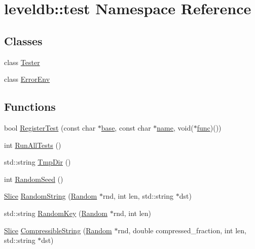 \hypertarget{namespaceleveldb_1_1test}{\section{leveldb\-:\-:test Namespace Reference}
\label{namespaceleveldb_1_1test}
}
\subsection*{Classes}
\begin{DoxyCompactItemize}
\item 
class \hyperlink{classleveldb_1_1test_1_1_tester}{Tester}
\item 
class \hyperlink{classleveldb_1_1test_1_1_error_env}{Error\-Env}
\end{DoxyCompactItemize}
\subsection*{Functions}
\begin{DoxyCompactItemize}
\item 
bool \hyperlink{namespaceleveldb_1_1test_aecde3e0440c4462e8d73aad728e3e819}{Register\-Test} (const char $\ast$\hyperlink{testharness_8cc_a70ff0f6c026c3dd1ef6aaf504e7fddc3}{base}, const char $\ast$\hyperlink{testharness_8cc_a8f8f80d37794cde9472343e4487ba3eb}{name}, void($\ast$\hyperlink{testharness_8cc_a0a8271b25a6a647b48a0be0bc49c9409}{func})())
\item 
int \hyperlink{namespaceleveldb_1_1test_a3329162c54a0bff42d41c2ac86b2580a}{Run\-All\-Tests} ()
\item 
std\-::string \hyperlink{namespaceleveldb_1_1test_ac259aab85eedba03d163bb3a86ae4645}{Tmp\-Dir} ()
\item 
int \hyperlink{namespaceleveldb_1_1test_a0d48ce23bccd2763df90789cb3aac03c}{Random\-Seed} ()
\item 
\hyperlink{classleveldb_1_1_slice}{Slice} \hyperlink{namespaceleveldb_1_1test_a2132c5f28cd21dcea4348246fa32b673}{Random\-String} (\hyperlink{classleveldb_1_1_random}{Random} $\ast$rnd, int len, std\-::string $\ast$dst)
\item 
std\-::string \hyperlink{namespaceleveldb_1_1test_ae6faec2042472bb9c3da124a677c4b96}{Random\-Key} (\hyperlink{classleveldb_1_1_random}{Random} $\ast$rnd, int len)
\item 
\hyperlink{classleveldb_1_1_slice}{Slice} \hyperlink{namespaceleveldb_1_1test_ad213d475feebfeb1c860151ed824f318}{Compressible\-String} (\hyperlink{classleveldb_1_1_random}{Random} $\ast$rnd, double compressed\-\_\-fraction, int len, std\-::string $\ast$dst)
\end{DoxyCompactItemize}


